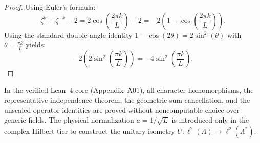 \begin{proof}
Using Euler's formula:
\[
\zeta^k + \zeta^{-k} - 2 = 2 \cos\left(\frac{2\pi k}{L}\right) - 2 = -2 \left(1 - \cos\left(\frac{2\pi k}{L}\right)\right).
\]
Using the standard double-angle identity $1 - \cos(2\theta) = 2 \sin^2(\theta)$ with $\theta = \frac{\pi k}{L}$ yields:
\[
-2 \left(2 \sin^2\left(\frac{\pi k}{L}\right)\right) = - 4 \sin^2\left(\frac{\pi k}{L}\right).
\]
\end{proof}

\begin{remark}
In the verified Lean~4 core (Appendix~A01), all character homomorphisms, the representative-independence theorem, the geometric sum cancellation, and the unscaled operator identities are proved without noncomputable choice over generic fields. The physical normalization $a = 1/\sqrt{L}$ is introduced only in the complex Hilbert tier to construct the unitary isometry $U: \ell^2(\Lambda) \to \ell^2(\Lambda^*)$.
\end{remark}
